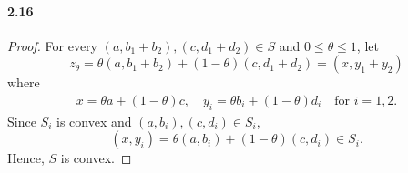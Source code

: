 \paragraph{2.16}
\begin{proof}
  For every $(a,b_1+b_2),(c,d_1+d_2)\in S$ and $0\le\theta\le 1$, let 
  \[
    z_\theta = \theta(a,b_1+b_2)+(1-\theta)(c,d_1+d_2) = (x,y_1+y_2)
  \]
  where
  \begin{align*}
    x = \theta a+(1-\theta) c,\quad
    y_i = \theta b_i+(1-\theta)d_i\quad\text{for $i=1,2$}.
  \end{align*}
  Since $S_i$ is convex and $(a,b_i),(c,d_i)\in S_i$,
  \[
    (x,y_i)=\theta(a,b_i) + (1-\theta)(c,d_i)\in S_i.
  \]
  Hence, $S$ is convex.
\end{proof}

